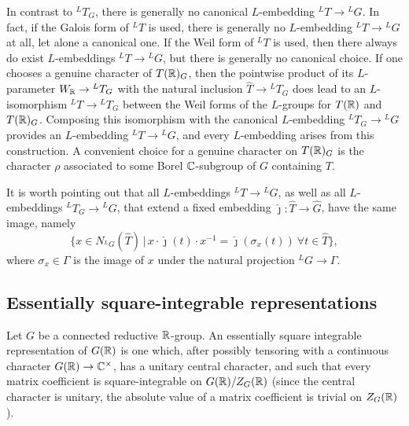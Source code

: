 \documentclass{article}
\theoremstyle{definition}
\numberwithin{equation}{section}
\renewcommand{\-}{\hyp{}}
\begin{document}
In contrast to $^LT_G$, there is generally no canonical $L$-embedding $^LT \to {^LG}$. In fact, if the Galois form of $^LT$ is used, there is generally no $L$-embedding $^LT \to {^LG}$ at all, let alone a canonical one. If the Weil form of $^LT$ is used, then there always do exist $L$-embeddings $^LT \to {^LG}$, but there is generally no canonical choice. If one chooses a genuine character of $T(\mathbb{R})_G$, then the pointwise product of its $L$-parameter $W_{\mathbb{R}} \to {^LT_G}$ with the natural inclusion $\hat T \to {^LT_G}$ does lead to an $L$-isomorphism $^LT \to {^LT_G}$ between the Weil forms of the $L$-groups for $T(\mathbb{R})$ and $T(\mathbb{R})_G$. Composing this isomorphism with the canonical $L$-embedding $^LT_G \to {^LG}$ provides an $L$-embedding $^LT \to {^LG}$, and every $L$-embedding arises from this construction. A convenient choice for a genuine character on $T(\mathbb{R})_G$ is the character $\rho$ associated to some Borel $\mathbb{C}$-subgroup of $G$ containing $T$.

It is worth pointing out that all $L$-embeddings $^LT \to {^LG}$, as well as all $L$-embeddings $^LT_G \to {^LG}$, that extend a fixed embedding $\hat\jmath : \hat T \to \hat G$, have the same image, namely
\begin{equation} \label{eq:lembim}
\{x \in N_{^LG}(\hat T)\,|\, x\cdot\hat\jmath(t)\cdot x^{-1} = \hat\jmath(\sigma_x(t))\ \forall t \in \hat T\},
\end{equation}
where $\sigma_x \in \Gamma$ is the image of $x$ under the natural projection $^LG \to \Gamma$.


\subsection{Essentially square-integrable representations} \label{sub:essds}

Let $G$ be a connected reductive $\mathbb{R}$-group. An essentially square integrable representation of $G(\mathbb{R})$ is one which, after possibly tensoring with a continuous character $G(\mathbb{R}) \to \mathbb{C}^\times$, has a unitary central character, and such that every matrix coefficient is square-integrable on $G(\mathbb{R})/Z_G(\mathbb{R})$ (since the central character is unitary, the absolute value of a matrix coefficient is trivial on $Z_G(\mathbb{R})$).
\end{document}

